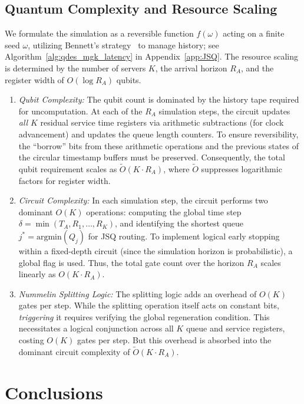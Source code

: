 \documentclass[11pt]{article}
\begin{document}
\subsection{Quantum Complexity and Resource Scaling}
We formulate the simulation as a reversible function $f(\omega)$ acting on a finite seed $\omega$, utilizing Bennett's strategy~\cite{bennett1973,bennett1989} to manage history; see Algorithm~\ref{alg:qdes_mgk_latency} in Appendix~\ref{app:JSQ}. The resource scaling is determined by the number of servers $K$, the arrival horizon $R_A$, and the register width of $O(\log R_A )$ qubits.
\begin{enumerate}
    \item \textit{Qubit Complexity:} The qubit count is dominated by the history tape required for uncomputation. At each of the $R_A$ simulation steps, the circuit updates \textit{all} $K$ residual service time registers via arithmetic subtractions (for clock advancement) and updates the queue length counters. To ensure reversibility, the ``borrow'' bits from these arithmetic operations and the previous states of the circular timestamp buffers must be preserved. Consequently, the total qubit requirement scales as $\tilde{O}(K \cdot R_A)$, where $\tilde{O}$ suppresses logarithmic factors for register width.
    \item \textit{Circuit Complexity:} In each simulation step, the circuit performs two dominant $O(K)$ operations: computing the global time step $\delta = \min(T_A, R_1, \dots, R_K)$, and identifying the shortest queue $j^* = \text{argmin}(Q_j)$ for JSQ routing. To implement logical early stopping within a fixed-depth circuit (since the simulation horizon is probabilistic), a global flag is used. Thus, the total gate count over the horizon $R_A$ scales linearly as $O(K \cdot R_A)$.
    \item \textit{Nummelin Splitting Logic:} The splitting logic adds an overhead of $O(K)$ gates per step. While the splitting operation itself acts on constant bits, \textit{triggering} it requires verifying the global regeneration condition. This necessitates a logical conjunction across all $K$ queue and service registers, costing $O(K)$ gates per step. But this overhead is absorbed into the dominant circuit complexity of $\tilde{O}(K \cdot R_A)$.
\end{enumerate}

\section{Conclusions}
\label{sec:conc}
\end{document}
